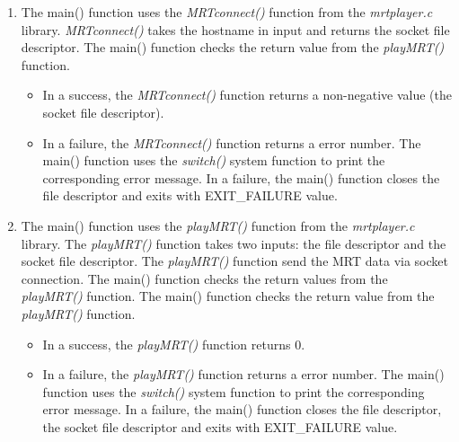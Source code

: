 \begin{enumerate}
\begin{enumerate}
  
  \item{The  main() function  uses the \emph{MRTconnect()} function from the \emph{mrtplayer.c} library. \emph{MRTconnect()} takes the hostname in input and returns the socket file descriptor. The main() function checks the return value from the \emph{playMRT()} function.}
   \begin{itemize}
  \item{In a success, the \emph{MRTconnect()} function returns a non-negative value (the socket file descriptor). }\
   \item{In a failure, the \emph{MRTconnect()} function returns a error number. The main() function uses the \emph{switch()} system function to print the corresponding error  message. In a failure, the main() function closes the file descriptor and exits with EXIT\_FAILURE value.}
  \end{itemize}
  
    
  \item{The  main() function  uses the \emph{playMRT()} function from the \emph{mrtplayer.c} library. The  \emph{playMRT()} function takes two inputs: the file descriptor and the socket file descriptor. The \emph{playMRT()} function send the  MRT data via socket connection. The main() function checks the return values from the \emph{playMRT()} function. The main() function checks the return value from the \emph{playMRT()} function.}
  \begin{itemize}
  \item{In a success, the \emph{playMRT()} function returns 0. }\
   \item{In a failure, the \emph{playMRT()} function returns a error number. The main() function uses the \emph{switch()} system function to print the corresponding error  message. In a failure, the main() function closes the file descriptor,  the  socket file descriptor and exits with EXIT\_FAILURE value.}
  \end{itemize}
  

\end{enumerate}
\end{enumerate}
